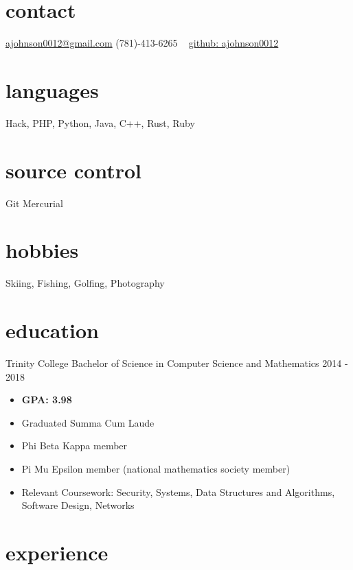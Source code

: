 \documentclass{johnsona_cv}
\begin{document}

\begin{aside}
\section{contact}
\href{mailto:ajohnson0012@gmail.com}{ajohnson0012@gmail.com}
(781)-413-6265
~
\href{https://www.github.com/ajohnson0012}{github: ajohnson0012}
\section{languages}
Hack, PHP, Python, Java, C++, Rust, Ruby
\section{source control}
Git
Mercurial
\section{hobbies}
Skiing, Fishing, Golfing, Photography
\end{aside}


\section{education}
\begin{entrylist}

\entry
{Trinity College}
{Bachelor of Science {\normalfont in Computer Science and Mathematics}}
{2014 - 2018}
{
\begin{itemize}
    \item \textbf{GPA: 3.98}
    \item Graduated Summa Cum Laude
    \item Phi Beta Kappa member
    \item Pi Mu Epsilon member (national mathematics society member)
    \item Relevant Coursework: Security, Systems, Data Structures and Algorithms, Software Design, Networks
\end{itemize}
}
\end{entrylist}


\section{experience}
\end{document}
